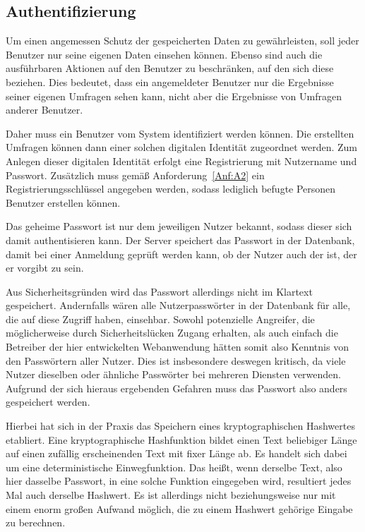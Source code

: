 \subsection{Authentifizierung}
\label{sec:authentifizierung}

Um einen angemessen Schutz der gespeicherten Daten zu gewährleisten, soll jeder Benutzer nur seine eigenen Daten einsehen können.
Ebenso sind auch die ausführbaren Aktionen auf den Benutzer zu beschränken, auf den sich diese beziehen.
Dies bedeutet, dass ein angemeldeter Benutzer nur die Ergebnisse seiner eigenen Umfragen sehen kann, nicht aber die Ergebnisse von Umfragen anderer Benutzer.

Daher muss ein Benutzer vom System identifiziert werden können.
Die erstellten Umfragen können dann einer solchen digitalen Identität zugeordnet werden.
Zum Anlegen dieser digitalen Identität erfolgt eine Registrierung mit Nutzername und Passwort.
Zusätzlich muss gemäß Anforderung~\ref{Anf:A2} ein Registrierungsschlüssel angegeben werden, sodass lediglich befugte Personen Benutzer erstellen können.

Das geheime Passwort ist nur dem jeweiligen Nutzer bekannt, sodass dieser sich damit authentisieren kann.
Der Server speichert das Passwort in der Datenbank, damit bei einer Anmeldung geprüft werden kann, ob der Nutzer auch der ist, der er vorgibt zu sein.

Aus Sicherheitsgründen wird das Passwort allerdings nicht im Klartext gespeichert.
Andernfalls wären alle Nutzerpasswörter in der Datenbank für alle, die auf diese Zugriff haben, einsehbar.
Sowohl potenzielle Angreifer, die möglicherweise durch Sicherheitslücken Zugang erhalten, als auch einfach die Betreiber der hier entwickelten Webanwendung hätten somit also Kenntnis von den Passwörtern aller Nutzer.
Dies ist insbesondere deswegen kritisch, da viele Nutzer dieselben oder ähnliche Passwörter bei mehreren Diensten verwenden.
Aufgrund der sich hieraus ergebenden Gefahren muss das Passwort also anders gespeichert werden.

Hierbei hat sich in der Praxis das Speichern eines kryptographischen Hashwertes etabliert.
Eine kryptographische Hashfunktion bildet einen Text beliebiger Länge auf einen zufällig erscheinenden Text mit fixer Länge ab.
Es handelt sich dabei um eine deterministische Einwegfunktion.
Das heißt, wenn derselbe Text, also hier dasselbe Passwort, in eine solche Funktion eingegeben wird, resultiert jedes Mal auch derselbe Hashwert.
Es ist allerdings nicht beziehungsweise nur mit einem enorm großen Aufwand möglich, die zu einem Hashwert gehörige Eingabe zu berechnen.

